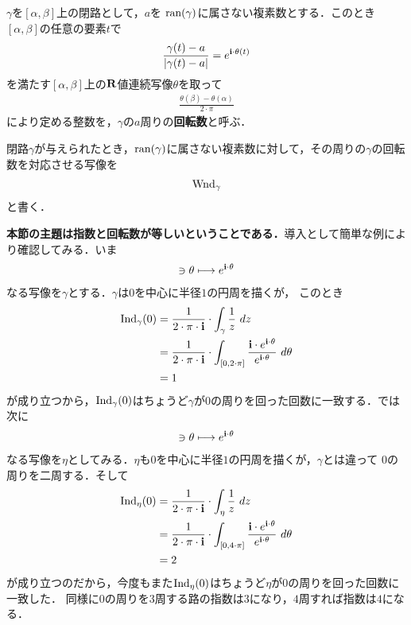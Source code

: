 	\begin{screen}
		\begin{dfn}[回転数]
			$\gamma$を$[\alpha,\beta]$上の閉路として，$a$を
			$\operatorname*{ran} (\gamma)$に属さない複素数とする．このとき$[\alpha,\beta]$の任意の要素$t$で
			\begin{align}
				\frac{\gamma(t) - a}{|\gamma(t) - a|} = e^{\mathbf{i}\cdot\theta(t)}
			\end{align}
			を満たす$[\alpha,\beta]$上の$\mathbf{R}$値連続写像$\theta$を取って
			\begin{align}
				\frac{\theta(\beta) - \theta(\alpha)}{2\cdot\pi}
			\end{align}
			により定める整数を，$\gamma$の$a$周りの{\bf 回転数}と呼ぶ．
		\end{dfn}
	\end{screen}
	
	閉路$\gamma$が与えられたとき，$\operatorname*{ran} (\gamma)$に属さない複素数に対して，その周りの$\gamma$の回転数を対応させる写像を
	\begin{align}
		\operatorname{Wnd}_{\gamma}
	\end{align}
	と書く．
	
	{\bf 本節の主題は指数と回転数が等しいということである．}導入として簡単な例により確認してみる．いま
	\begin{align}
		[0,2 \cdot \pi] \ni \theta \longmapsto e^{\isym \cdot \theta}
	\end{align}
	なる写像を$\gamma$とする．$\gamma$は$0$を中心に半径$1$の円周を描くが，
	このとき
	\begin{align}
		\Ind_{\gamma}(0) 
		&= \frac{1}{2\cdot\pi\cdot\isym} \cdot \int_{\gamma} \frac{1}{z}\ dz \\
		&= \frac{1}{2\cdot\pi\cdot\isym} \cdot \int_{[0,2\cdot\pi]} \frac{\isym \cdot e^{\isym \cdot \theta}}{e^{\isym \cdot \theta}}\ d\theta \\
		&= 1
	\end{align}
	が成り立つから，$\operatorname{Ind}_{\gamma}(0)$はちょうど$\gamma$が$0$の周りを回った回数に一致する．では次に
	\begin{align}
		[0,4 \cdot \pi] \ni \theta \longmapsto e^{\isym \cdot \theta}
	\end{align}
	なる写像を$\eta$としてみる．$\eta$も$0$を中心に半径$1$の円周を描くが，$\gamma$とは違って
	$0$の周りを二周する．そして
	\begin{align}
		\Ind_{\eta}(0) 
		&= \frac{1}{2\cdot\pi\cdot\isym} \cdot \int_{\eta} \frac{1}{z}\ dz \\
		&= \frac{1}{2\cdot\pi\cdot\isym} \cdot \int_{[0,4\cdot\pi]} \frac{\isym \cdot e^{\isym \cdot \theta}}{e^{\isym \cdot \theta}}\ d\theta \\
		&= 2
	\end{align}
	が成り立つのだから，今度もまた$\operatorname{Ind}_{\eta}(0)$はちょうど$\eta$が$0$の周りを回った回数に一致した．
	同様に$0$の周りを$3$周する路の指数は$3$になり，$4$周すれば指数は$4$になる．
	
